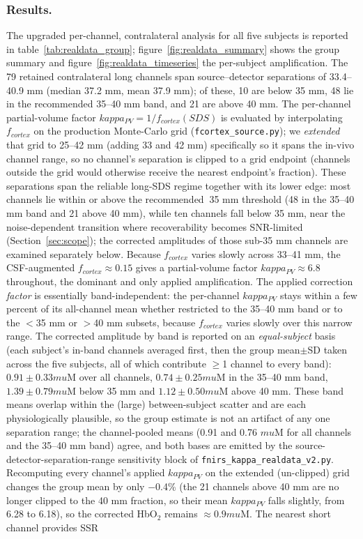 \documentclass[11pt]{article}
\def\kappa{kappa}%
\def\mu{mu}%
\def\sim{~}%
\def\mathrm#1{#1}%
\def\,{ }%
\begin{document}
\subsubsection{Results.}

The upgraded per-channel, contralateral analysis for all five subjects is reported in table~\ref{tab:realdata_group}; figure~\ref{fig:realdata_summary} shows the group summary and figure~\ref{fig:realdata_timeseries} the per-subject amplification. The 79 retained contralateral long channels span source--detector separations of 33.4--40.9\,mm (median 37.2\,mm, mean 37.9\,mm); of these, 10 are below 35\,mm, 48 lie in the recommended 35--40\,mm band, and 21 are above 40\,mm. The per-channel partial-volume factor $\kappa_{\mathrm{PV}}=1/f_{\mathrm{cortex}}(\mathrm{SDS})$ is evaluated by interpolating $f_{\mathrm{cortex}}$ on the production Monte-Carlo grid (\texttt{fcortex\_source.py}); we \emph{extended} that grid to 25--42\,mm (adding 33 and 42\,mm) specifically so it spans the in-vivo channel range, so no channel's separation is clipped to a grid endpoint (channels outside the grid would otherwise receive the nearest endpoint's fraction). These separations span the reliable long-SDS regime together with its lower edge: most channels lie within or above the recommended $\sim$35\,mm threshold (48 in the 35--40\,mm band and 21 above 40\,mm), while ten channels fall below 35\,mm, near the noise-dependent transition where recoverability becomes SNR-limited (Section~\ref{sec:scope}); the corrected amplitudes of those sub-35\,mm channels are examined separately below. Because $f_{\mathrm{cortex}}$ varies slowly across 33--41\,mm, the CSF-augmented $f_{\mathrm{cortex}}\approx0.15$ gives a partial-volume factor $\kappa_{\mathrm{PV}}\approx6.8$ throughout, the dominant and only applied amplification. The applied correction \emph{factor} is essentially band-independent: the per-channel $\kappa_{\mathrm{PV}}$ stays within a few percent of its all-channel mean whether restricted to the 35--40\,mm band or to the $<$35\,mm or $>$40\,mm subsets, because $f_{\mathrm{cortex}}$ varies slowly over this narrow range. The corrected amplitude by band is reported on an \emph{equal-subject} basis (each subject's in-band channels averaged first, then the group mean$\pm$SD taken across the five subjects, all of which contribute $\geq$1 channel to every band): $0.91\pm0.33\,\mu$M over all channels, $0.74\pm0.25\,\mu$M in the 35--40\,mm band, $1.39\pm0.79\,\mu$M below 35\,mm and $1.12\pm0.50\,\mu$M above 40\,mm. These band means overlap within the (large) between-subject scatter and are each physiologically plausible, so the group estimate is not an artifact of any one separation range; the channel-pooled means (0.91 and 0.76\,$\mu$M for all channels and the 35--40\,mm band) agree, and both bases are emitted by the source-detector-separation-range sensitivity block of \texttt{fnirs\_kappa\_realdata\_v2.py}. Recomputing every channel's applied $\kappa_{\mathrm{PV}}$ on the extended (un-clipped) grid changes the group mean by only $-$0.4\% (the 21 channels above 40\,mm are no longer clipped to the 40\,mm fraction, so their mean $\kappa_{\mathrm{PV}}$ falls slightly, from 6.28 to 6.18), so the corrected HbO$_2$ remains $\approx0.9\,\mu$M. The nearest short channel provides SSR 
\end{document}
